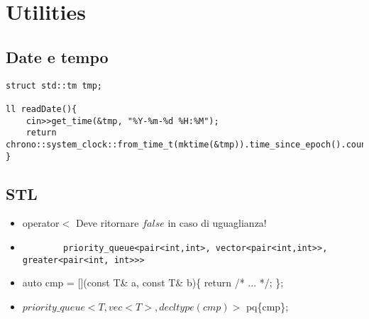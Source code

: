 \section{Utilities}

\subsection{Date e tempo}
\begin{lstlisting}
struct std::tm tmp;

ll readDate(){
	cin>>get_time(&tmp, "%Y-%m-%d %H:%M");
	return chrono::system_clock::from_time_t(mktime(&tmp)).time_since_epoch().count();
}
\end{lstlisting}

\subsection{STL}
\begin{itemize}
    \item operator$<$ Deve ritornare $false$ in caso di uguaglianza!
    \item \begin{lstlisting}
        priority_queue<pair<int,int>, vector<pair<int,int>>, greater<pair<int, int>>>
    \end{lstlisting}
    \item auto cmp = [](const T\& a, const T\& b)\{ return /* ... */; \};
    \item $priority\_queue<T,vec<T>,decltype(cmp)>$ pq\{cmp\};
\end{itemize}
